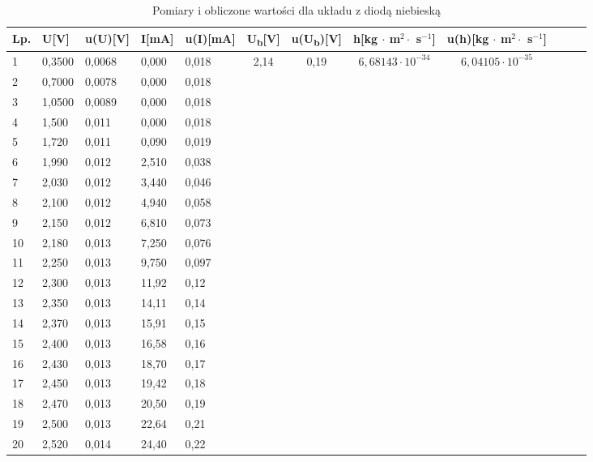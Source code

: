 \documentclass[12pt]{article}
\begin{document}
\begin{table}[]
    \caption*{Pomiary i obliczone wartości dla układu z diodą niebieską}
        \begin{tabular}{|l|l|l|l|l|c|c|c|c|c|c|c|} \hline
        Lp. & U[V] & u(U)[V] & I[mA] & u(I)[mA] & U\textsubscript{b}[V] & u(U\textsubscript{b})[V] & h[kg $\cdot$ m$^2 \cdot$ s$^{-1}$] & u(h)[kg $\cdot$ m$^2 \cdot$ s$^{-1}$] \\ \hline
        1 & 0,3500 & 0,0068 & 0,000 & 0,018 & \multirow{20}{*}{2,14} & \multirow{20}{*}{0,19} & \multirow{20}{*}{$6,68143 \cdot 10^{-34}$} & \multirow{20}{*}{$6,04105 \cdot 10^{-35}$} \\ \cline{1-5}
        2 & 0,7000 & 0,0078 & 0,000 & 0,018 &  &  &  &  \\ \cline{1-5}
        3 & 1,0500 & 0,0089 & 0,000 & 0,018 &  &  &  &  \\ \cline{1-5}
        4 & 1,500 & 0,011 & 0,000 & 0,018 &  &  &  &  \\ \cline{1-5}
        5 & 1,720 & 0,011 & 0,090 & 0,019 &  &  &  &  \\ \cline{1-5}
        6 & 1,990 & 0,012 & 2,510 & 0,038 &  &  &  &  \\ \cline{1-5}
        7 & 2,030 & 0,012 & 3,440 & 0,046 &  &  &  &  \\ \cline{1-5}
        8 & 2,100 & 0,012 & 4,940 & 0,058 &  &  &  &  \\ \cline{1-5}
        9 & 2,150 & 0,012 & 6,810 & 0,073  &  &  &  &  \\ \cline{1-5}
        10 & 2,180 & 0,013 & 7,250 & 0,076 &  &  &  &  \\ \cline{1-5}
        11 & 2,250 & 0,013 & 9,750 & 0,097 &  &  &  &  \\ \cline{1-5}
        12 & 2,300 & 0,013 & 11,92 & 0,12 &  &  &  &  \\ \cline{1-5}
        13 & 2,350 & 0,013 & 14,11 & 0,14 &  &  &  &  \\ \cline{1-5}
        14 & 2,370 & 0,013 & 15,91 & 0,15 &  &  &  &  \\ \cline{1-5}
        15 & 2,400 & 0,013 & 16,58 & 0,16 &  &  &  &  \\ \cline{1-5}
        16 & 2,430 & 0,013 & 18,70 & 0,17 &  &  &  &  \\ \cline{1-5}
        17 & 2,450 & 0,013 & 19,42 & 0,18 &  &  &  &  \\ \cline{1-5}
        18 & 2,470 & 0,013 & 20,50 & 0,19 &  &  &  &  \\ \cline{1-5}
        19 & 2,500 & 0,013 & 22,64 & 0,21 &  &  &  &  \\ \cline{1-5}
        20 & 2,520 & 0,014 & 24,40 & 0,22 &  &  &  &  \\ \hline
        \end{tabular}
\end{table}
\end{document}
